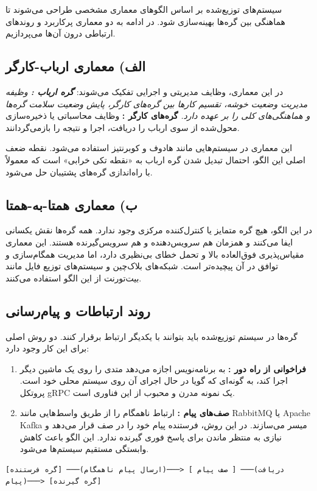 \documentclass[12pt,a4paper,openany]{book}
\begin{document}
سیستم‌های توزیع‌شده بر اساس الگوهای معماری مشخصی طراحی می‌شوند تا هماهنگی بین گره‌ها بهینه‌سازی شود. در ادامه به دو معماری پرکاربرد و روندهای ارتباطی درون آن‌ها می‌پردازیم.

\subsection{الف) معماری ارباب-کارگر }

در این معماری، وظایف مدیریتی و اجرایی تفکیک می‌شوند: \textit{ \textbf{گره ارباب :} وظیفه مدیریت وضعیت خوشه، تقسیم کارها بین گره‌های کارگر، پایش وضعیت سلامت  گره‌ها و هماهنگی‌های کلی را بر عهده دارد. } \textbf{گره‌های کارگر :} وظایف محاسباتی یا ذخیره‌سازی محول‌شده از سوی ارباب را دریافت، اجرا و نتیجه را بازمی‌گردانند.

این معماری در سیستم‌هایی مانند هادوف  و کوبرنتیز  استفاده می‌شود. نقطه ضعف اصلی این الگو، احتمال تبدیل شدن گره ارباب به «نقطه تکی خرابی»  است که معمولاً با راه‌اندازی گره‌های پشتیبان  حل می‌شود.

\subsection{ب) معماری همتا-به-همتا }

در این الگو، هیچ گره متمایز یا کنترل‌کننده مرکزی وجود ندارد. همه گره‌ها نقش یکسانی ایفا می‌کنند و همزمان هم سرویس‌دهنده و هم سرویس‌گیرنده هستند. این معماری مقیاس‌پذیری فوق‌العاده بالا و تحمل خطای بی‌نظیری دارد، اما مدیریت همگام‌سازی و توافق در آن پیچیده‌تر است. شبکه‌های بلاک‌چین و سیستم‌های توزیع فایل مانند بیت‌تورنت از این الگو استفاده می‌کنند.

\subsection{روند ارتباطات و پیام‌رسانی}

گره‌ها در سیستم توزیع‌شده باید بتوانند با یکدیگر ارتباط برقرار کنند. دو روش اصلی برای این کار وجود دارد:

\begin{enumerate}
\item \textbf{فراخوانی از راه دور :} به برنامه‌نویس اجازه می‌دهد متدی را روی یک ماشین دیگر اجرا کند، به گونه‌ای که گویا در حال اجرای آن روی سیستم محلی خود است. پروتکل gRPC یک نمونه مدرن و محبوب از این فناوری است.
\item \textbf{صف‌های پیام :} ارتباط ناهمگام  را از طریق واسط‌هایی مانند RabbitMQ یا Apache Kafka میسر می‌سازند. در این روش، فرستنده پیام خود را در صف قرار می‌دهد و نیازی به منتظر ماندن برای پاسخ فوری گیرنده ندارد. این الگو باعث کاهش وابستگی مستقیم  سیستم‌ها می‌شود.
\end{enumerate}
\begin{LTR}
\begin{verbatim}
[گره فرستنده] ───(ارسال پیام ناهمگام)───> [ صف پیام ] ───(دریافت پیام)───> [گره گیرنده]
\end{verbatim}
\end{LTR}
\end{document}
